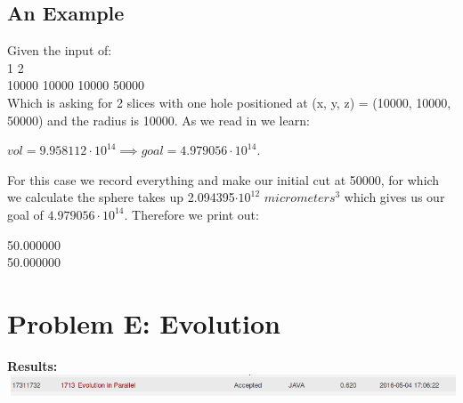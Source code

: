 \documentclass[12pt]{article}
\begin{document}
\subsection{An Example}
Given the input of:  \\
1 2                         \\
10000 10000 10000 50000     \\

Which is asking for 2 slices with one hole positioned at (x, y, z) = (10000, 10000, 50000) and the
radius is 10000. As we read in we learn:
\begin{center}$vol = 9.958112\cdot10^{14} \implies goal = 4.979056\cdot10^{14}$.\end{center}
For this case we record everything and make our initial cut at 50000, for which we calculate the sphere
takes up 2.094395$\cdot10^{12}$ $micrometers^3$ which gives us our goal of $4.979056\cdot10^{14}$. Therefore
we print out:
\begin{center}50.000000 \\
50.000000\end{center}

\newpage















\section{Problem E: Evolution}
\noindent \textbf{Results:} \\

\includegraphics[width=\textwidth]{ProblemE} \\
\end{document}
